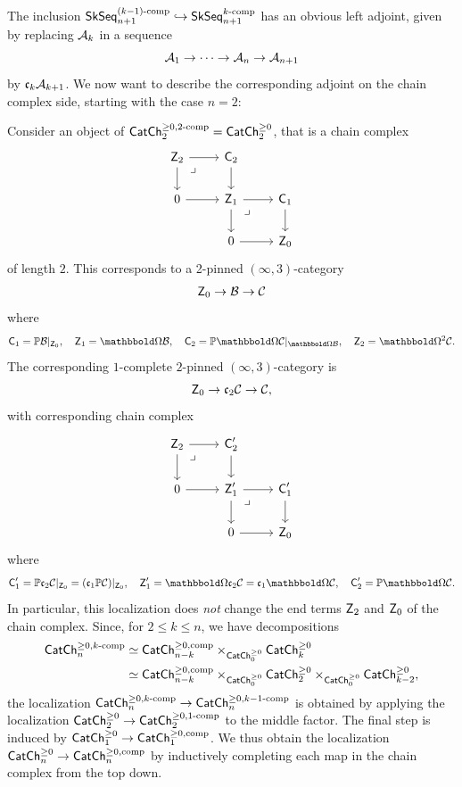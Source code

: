 \documentclass[a4paper,11pt]{article}
\begin{document}
The inclusion
$\SkSeq_{n+1}^{(k-1)\dcomp} \hookrightarrow  \SkSeq_{n+1}^{k\dcomp}$ has an obvious left
adjoint, given by replacing  $\nA_{k}$ in a sequence
\[ \nA_{1} \to \cdots \to \nA_{n} \to \nA_{n+1}\]
by $\core[k]\nA_{k+1}$. We now want to describe the corresponding
adjoint on the chain complex side, starting with the case $n = 2$:
\begin{observation}
  Consider an object of $\CChpcgr{2}_{2} = \CChp_{2}$, that is a chain complex
  \[
    \begin{tikzcd}
      \oZ_{2} \ar[r] \ar[d] \drpullback & \oC_{2} \ar[d] \\
      0 \ar[r] & \oZ_{1} \ar[d] \ar[r]\drpullback  & \oC_{1} \ar[d] \\
      &  0 \ar[r] & \oZ_{0}
    \end{tikzcd}
  \]
  of length $2$. This
  corresponds to a 2-pinned $(\infty,3)$-category
  \[ \oZ_{0} \to \nB \to \nC\]
  where
  \[ \oC_{1} = \mP\nB|_{\oZ_{0}},
    \quad \oZ_{1} = \mOm\nB, \quad \oC_{2} = \mP\mOm\nC|_{\mOm\nB}, \quad \oZ_{2} = \mOm^{2}\nC.\]
  The corresponding $1$-complete $2$-pinned $(\infty,3)$-category is
  \[ \oZ_{0} \to \core[2]\nC \to \nC,\]
  with corresponding chain complex
  \[
    \begin{tikzcd}
      \oZ_{2} \ar[r] \ar[d] \drpullback & \oC'_{2} \ar[d] \\
      0 \ar[r] & \oZ'_{1} \ar[d] \ar[r]\drpullback  & \oC'_{1} \ar[d] \\
      &  0 \ar[r] & \oZ_{0}
    \end{tikzcd}
  \]
  where
  \[ \oC'_{1} = \mP\core[2]\nC|_{\oZ_{0}} = (\core \mP\nC)|_{\oZ_{0}},  
    \quad \oZ'_{1} = \mOm \core[2] \nC = \core\mOm\nC, \quad \oC'_{2} = \mP \mOm \nC.\]
  In particular, this localization does \emph{not} change the end terms
  $\oZ_{2}$ and $\oZ_{0}$ of the chain complex. Since, for $2 \leq k
  \leq n$, we have decompositions
  \[
    \begin{split}
      \CChpcgr{k}_{n} & \simeq \CChpc_{n-k}
                        \times_{\CChp_{0}} \CChp_{k} \\
       & \simeq \CChpc_{n-k}
      \times_{\CChp_{0}} \CChp_{2} \times_{\CChp_{0}} \CChp_{k-2},
    \end{split}
  \]
  the localization $\CChpcgr{k}_{n} \to \CChpcgr{k-1}_{n}$ is
  obtained by applying the localization $\CChp_{2} \to
  \CChpcgr{1}_{2}$ to the middle factor. The final step is induced by
  $\CChp_{1} \to \CChpc_{1}$. We thus obtain the localization
  $\CChp_{n} \to \CChpc_{n}$ by inductively completing each map in
  the chain complex from the top down.
\end{observation}
\end{document}
